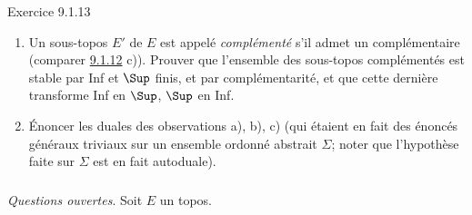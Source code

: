 \documentclass[10pt]{../fichiers-configuration-latex/smfart}
\begin{document}
\begin{enonce*}[remark]{Exercice 9.1.13}
\begin{enumerate}
\item Un sous-topos $E'$ de $E$ est appelé \emph{complémenté} s'il
admet un complémentaire (comparer \hyperref[IV.exer9.1.12]{9.1.12} c)). Prouver
que l'ensemble des sous-topos complémentés est stable par Inf et
$\Sup$ finis, et par complémentarité, et que cette dernière
transforme Inf en $\Sup$, $\Sup$ en Inf.

\item Énoncer les duales des observations a), b), c) (qui étaient en
fait des énoncés généraux triviaux sur un ensemble ordonné abstrait
$\Sigma$; noter que l'hypothèse faite sur $\Sigma$ est en fait
autoduale).
\end{enumerate}
\end{enonce*}

\setcounter{subsubsection}{13}
\subsubsection{}
\emph{Questions ouvertes}. Soit $E$ un topos.
\end{document}

